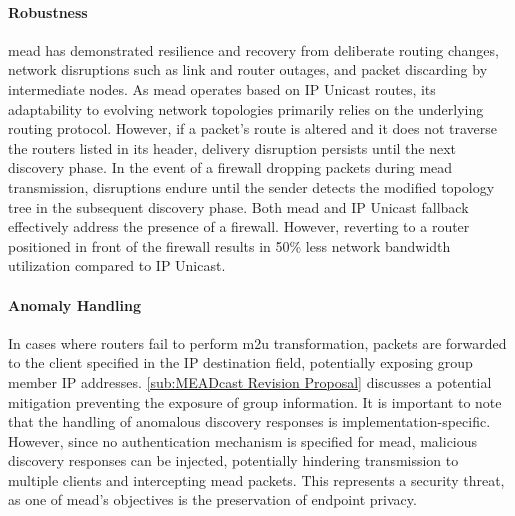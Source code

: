 \begin{itemize}
    \paragraph{Robustness}
    \gls{mead} has demonstrated resilience and recovery from deliberate routing
        changes, network disruptions such as link and router outages, and
        packet discarding by intermediate nodes.
    As \gls{mead} operates based on IP Unicast routes, its adaptability to
        evolving network topologies primarily relies on the underlying routing
        protocol.
    However, if a packet's route is altered and it does not traverse the
        routers listed in its header, delivery disruption persists until the
        next discovery phase.
        In the event of a firewall dropping packets during \gls{mead} transmission,
        disruptions endure until the sender detects the modified topology tree
        in the subsequent discovery phase.
    Both \gls{mead} and IP Unicast fallback effectively address the presence of
        a firewall.
    However, reverting to a router positioned in front of the firewall results
        in 50\% less network bandwidth utilization compared to IP Unicast.

    \paragraph{Anomaly Handling}
    In cases where routers fail to perform \gls{m2u} transformation, packets
        are forwarded to the client specified in the IP destination field,
        potentially exposing group member IP addresses.
    \autoref{sub:MEADcast Revision Proposal} discusses a potential mitigation
        preventing the exposure of group information.
    It is important to note that the handling of anomalous discovery responses
        is implementation-specific.
    However, since no authentication mechanism is specified for \gls{mead},
        malicious discovery responses can be injected, potentially hindering
        transmission to multiple clients and intercepting \gls{mead} packets.
    This represents a security threat, as one of \gls{mead}'s objectives is the
        preservation of endpoint privacy.


\end{itemize}
